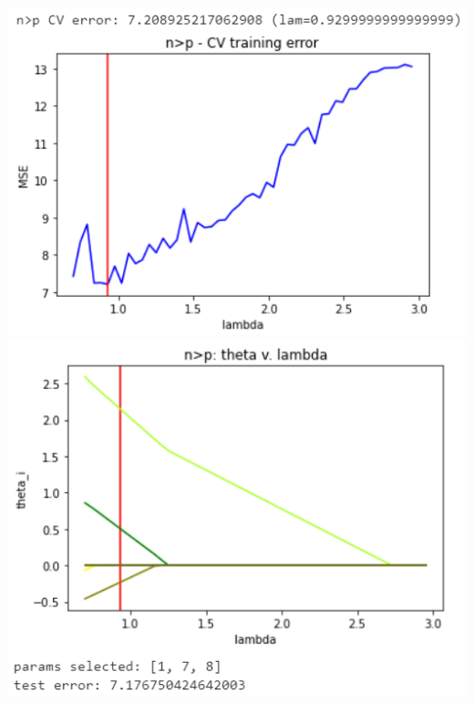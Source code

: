 \documentclass[11pt]{article}
\begin{document}
\begin{center}
\includegraphics[scale=0.7]{charts/ridge_st_ortho_n_gt_p_err.PNG}
\includegraphics[scale=0.7]{charts/ridge_st_ortho_n_gt_p_thetas.PNG}


\end{center}
\end{document}

